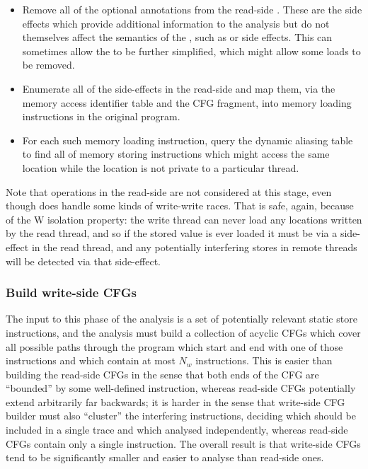 \begin{itemize}
\item
  Remove all of the optional annotations from the read-side
  \StateMachine.  These are the side effects which provide additional
  information to the analysis but do not themselves affect the
  semantics of the \StateMachine, such as  or
   side effects.  This can sometimes allow the
  {\StateMachine} to be further simplified, which might allow
  some loads to be removed.  
\item
  Enumerate all of the  side-effects in the read-side
  {\StateMachine} and map them, via the memory access identifier table
  and the CFG fragment, into memory loading instructions in the original program.
\item
  For each such memory loading instruction, query the dynamic aliasing
  table to find all of memory storing instructions which might access
  the same location while the location is not private to a particular
  thread.
\end{itemize}

Note that  operations in the read-side {\StateMachine}
are not considered at this stage, even though {\technique} does handle
some kinds of write-write races.  That is safe, again, because of the
W isolation property: the write thread can never load any locations
written by the read thread, and so if the stored value is ever loaded
it must be via a  side-effect in the read thread, and any
potentially interfering stores in remote threads will be detected via
that  side-effect.  

\subsubsection{Build write-side CFGs}

The input to this phase of the analysis is a set of potentially
relevant static store instructions, and the analysis must build a
collection of acyclic CFGs which cover all possible paths through the
program which start and end with one of those instructions and which
contain at most $N_w$ instructions.  This is easier than building the
read-side CFGs in the sense that both ends of the CFG are ``bounded''
by some well-defined instruction, whereas read-side CFGs potentially
extend arbitrarily far backwards; it is harder in the sense that
write-side CFG builder must also ``cluster'' the interfering
instructions, deciding which should be included in a single trace and
which analysed independently, whereas read-side CFGs contain only a
single instruction.  The overall result is that write-side CFGs tend
to be significantly smaller and easier to analyse than read-side ones.

